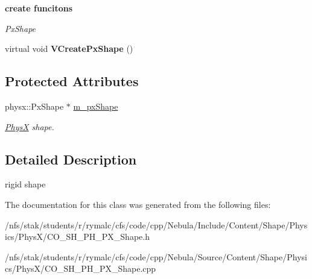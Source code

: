 \begin{Indent}{\bf create funcitons}\par
{\em \label{_amgrp6b23793a22eaab4b0141b8612189f046}
 PxShape }\begin{DoxyCompactItemize}
\item 
\hypertarget{classContent_1_1Shape_1_1Physics_1_1PhysX_1_1Shape_ae095f0bebccc76f89b58ab0033b55186}{
virtual void {\bfseries VCreatePxShape} ()}
\label{classContent_1_1Shape_1_1Physics_1_1PhysX_1_1Shape_ae095f0bebccc76f89b58ab0033b55186}

\end{DoxyCompactItemize}
\end{Indent}
\subsection*{Protected Attributes}
\begin{DoxyCompactItemize}
\item 
\hypertarget{classContent_1_1Shape_1_1Physics_1_1PhysX_1_1Shape_ab7e50c165fbc60e304ecc83bc40a4fe0}{
physx::PxShape $\ast$ \hyperlink{classContent_1_1Shape_1_1Physics_1_1PhysX_1_1Shape_ab7e50c165fbc60e304ecc83bc40a4fe0}{m\_\-pxShape}}
\label{classContent_1_1Shape_1_1Physics_1_1PhysX_1_1Shape_ab7e50c165fbc60e304ecc83bc40a4fe0}

\begin{DoxyCompactList}\small\item\em \hyperlink{namespaceContent_1_1Shape_1_1Physics_1_1PhysX}{PhysX} shape. \item\end{DoxyCompactList}\end{DoxyCompactItemize}


\subsection{Detailed Description}
rigid shape 

The documentation for this class was generated from the following files:\begin{DoxyCompactItemize}
\item 
/nfs/stak/students/r/rymalc/cfs/code/cpp/Nebula/Include/Content/Shape/Physics/PhysX/CO\_\-SH\_\-PH\_\-PX\_\-Shape.h\item 
/nfs/stak/students/r/rymalc/cfs/code/cpp/Nebula/Source/Content/Shape/Physics/PhysX/CO\_\-SH\_\-PH\_\-PX\_\-Shape.cpp\end{DoxyCompactItemize}
